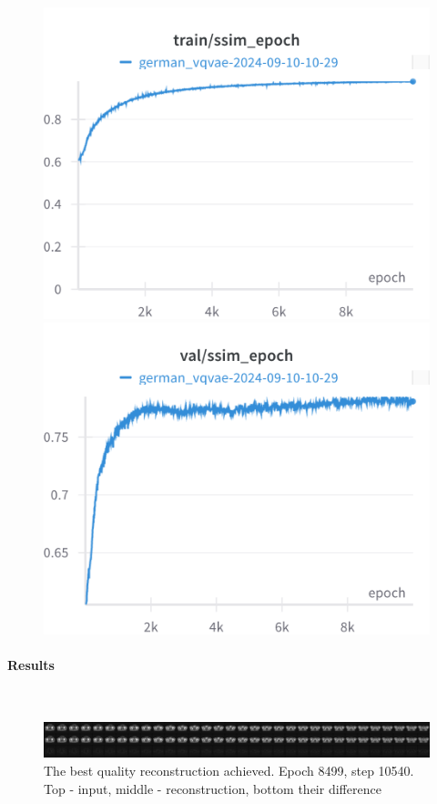 \begin{figure}[H]
\includegraphics[width=\linewidth]{detailed_engineering/German VQVAE/charts/train_ssim.png}
\caption{}
\endminipage\hfill
{}
\includegraphics[width=\linewidth]{detailed_engineering/German VQVAE/charts/val_ssim.png}
\caption{}
\endminipage
\end{figure}




\paragraph{Results}\mbox{}\\

\begin{figure}[H]
    \centering
    \includegraphics[width=\linewidth]{detailed_engineering/German VQVAE/charts/best_german_vqvae.png}
    \caption{The best quality reconstruction achieved. Epoch 8499, step 10540. Top - input, middle - reconstruction, bottom their difference}
    \label{fig:german_vqvae_best}
\end{figure}

